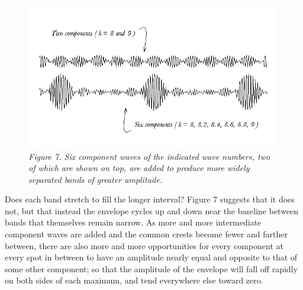 \begin{figure}[h] %
  \centering
    \includegraphics[width=4.35334in,height=2.52in]{images/08_debroglie/image041.png}
    \caption*{\emph{Figure 7. Six component waves of the indicated wave numbers, two of
     which are shown on top, are added to produce more widely separated bands
     of greater amplitude.}}
\end{figure}

Does each band stretch to fill the longer interval? Figure 7 suggests
that it does not, but that instead the envelope cycles up and down near
the baseline between bands that themselves remain narrow. As more and
more intermediate component waves are added and the common crests become
fewer and farther between, there are also more and more opportunities
for every component at every spot in between to have an amplitude nearly
equal and opposite to that of some other component; so that the
amplitude of the envelope will fall off rapidly on both sides of each
maximum, and tend everywhere else toward zero.

